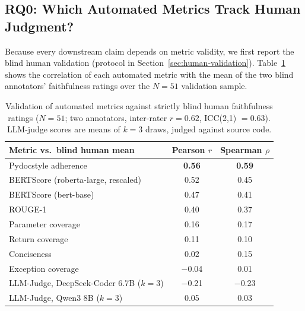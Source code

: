 \documentclass[pdflatex,sn-mathphys-ay]{sn-jnl}%
\theoremstyle{thmstyleone}%
\theoremstyle{thmstyletwo}%
\theoremstyle{thmstylethree}%
\begin{document}
\subsection{RQ0: Which Automated Metrics Track Human Judgment?}
\label{sec:rq0}
Because every downstream claim depends on metric validity, we first report the blind human validation (protocol in Section~\ref{sec:human-validation}). Table~\ref{tab:human-corr} shows the correlation of each automated metric with the mean of the two blind annotators' faithfulness ratings over the $N{=}51$ validation sample.

\begin{table}[h]
\centering
\small
\caption{Validation of automated metrics against strictly blind human faithfulness ratings ($N{=}51$; two annotators, inter-rater $r=0.62$, ICC(2,1) $=0.63$). LLM-judge scores are means of $k{=}3$ draws, judged against source code.}
\label{tab:human-corr}
\begin{tabular}{lcc}
\toprule
\textbf{Metric vs.\ blind human mean} & \textbf{Pearson $r$} & \textbf{Spearman $\rho$} \\
\midrule
Pydocstyle adherence                        & \textbf{0.56} & \textbf{0.59} \\
BERTScore (roberta-large, rescaled)         & 0.52          & 0.45 \\
BERTScore (bert-base)                       & 0.47          & 0.41 \\
ROUGE-1                                     & 0.40          & 0.37 \\
Parameter coverage                          & 0.16          & 0.17 \\
Return coverage                             & 0.11          & 0.10 \\
Conciseness                                 & 0.02          & 0.15 \\
Exception coverage                          & $-$0.04       & 0.01 \\
\midrule
LLM-Judge, DeepSeek-Coder 6.7B ($k{=}3$)    & $-$0.21       & $-$0.23 \\
LLM-Judge, Qwen3 8B ($k{=}3$)               & 0.05          & 0.03 \\
\bottomrule
\end{tabular}
\end{table}
\end{document}
